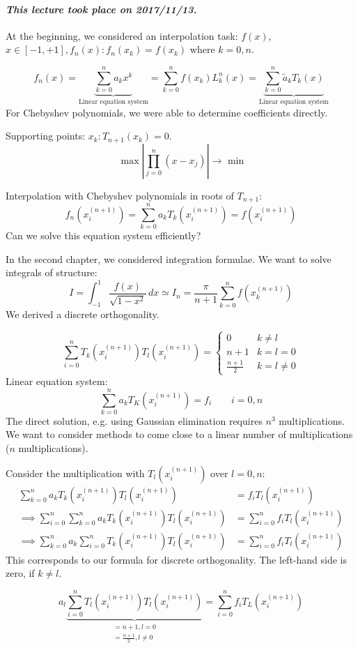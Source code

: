 \documentclass{article}
\newcommand{\card}[1]{\left|#1\right|}
\newcommand{\dateref}[1]{\paragraph{\textit{This lecture took place on #1.}}}
\begin{document}
\dateref{2017/11/13}

At the beginning, we considered an interpolation task:
$f(x)$, $x \in [-1, +1], f_n(x): f_n(x_k) = f(x_k)$ where $k = 0,n$.

\[
  f_n(x)
    = \underbrace{\sum_{k=0}^n a_k x^k}_{\text{Linear equation system}}
  = \sum_{k=0}^n f(x_k) L_k^n(x)
  = \underbrace{\sum_{k=0}^n \tilde{a}_k T_k(x)}_{\text{Linear equation system}}
\]
For Chebyshev polynomials, we were able to determine coefficients directly.

Supporting points:
$x_k: T_{n+1}(x_k) = 0$.
\[ \max\card{\prod_{j=0}^n (x - x_j)} \to \text{ min} \]

Interpolation with Chebyshev polynomials in roots of $T_{n+1}$:
\[ f_n(x_i^{(n+1)}) = \sum_{k=0}^n a_k T_k(x_i^{(n+1)}) = f(x_i^{(n+1)}) \]
Can we solve this equation system efficiently?

In the second chapter, we considered integration formulae.
We want to solve integrals of structure:
\[ I = \int_{-1}^1 \frac{f(x)}{\sqrt{1 - x^2}} \, dx \simeq I_n = \frac{\pi}{n+1} \sum_{k=0}^n f(x_k^{(n+1)}) \]
We derived a discrete orthogonality.

\[
  \sum_{i=0}^n T_k(x_i^{(n+1)}) T_l(x_i^{(n+1)}) = \begin{cases}
    0 & k \neq l \\
    n+1 & k = l = 0 \\
    \frac{n+1}{2} & k = l \neq 0
  \end{cases}
\]
Linear equation system:
\[ \sum_{k=0}^n a_k T_K(x_i^{(n+1)}) = f_i \qquad i = 0,n \]
The direct solution, e.g. using Gaussian elimination requires $n^3$ multiplications.
We want to consider methods to come close to a linear number of multiplications ($n$ multiplications).

Consider the multiplication with $T_l(x_i^{(n+1)})$ over $l=0,n$:
\begin{align*}
  \sum_{k=0}^n a_k T_k(x_i^{(n+1)}) T_l(x_i^{(n+1)}) &= f_i T_l(x_i^{(n+1)}) \\
  \implies \sum_{i=0}^n \sum_{k=0}^n a_k T_k(x_i^{(n+1)}) T_l(x_i^{(n+1)}) &= \sum_{i=0}^n f_i T_l(x_i^{(n+1)}) \\
  \implies \sum_{k=0}^n a_k \sum_{i=0}^n T_k(x_i^{(n+1)}) T_l(x_i^{(n+1)}) &= \sum_{i=0}^n f_i T_l(x_i^{(n+1)})
\end{align*}
This corresponds to our formula for discrete orthogonality.
The left-hand side is zero, if $k \neq l$.

\[ a_l \underbrace{\sum_{i=0}^n T_l(x_i^{(n+1)}) T_l(x_i^{(n+1)})}_{\substack{= n+1, l = 0 \\ = \frac{n+1}{2}, l \neq 0}} = \sum_{i=0}^n f_i T_L(x_i^{(n+1)}) \]
\end{document}
